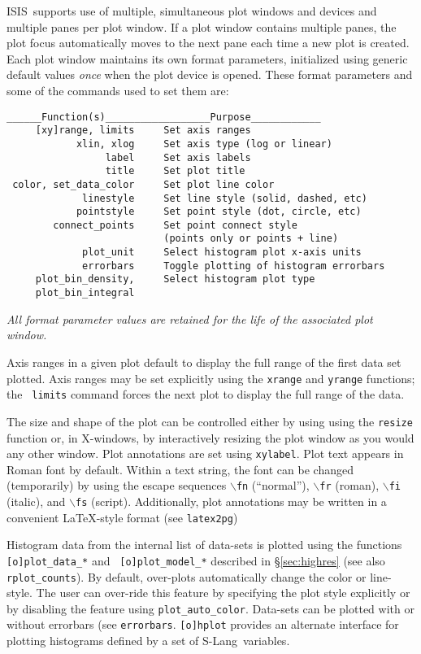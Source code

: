 \documentclass{book}
\newcommand{\isisx}{{\sc ISIS~}}
\newcommand{\slang}{{\sc S-Lang}}
\begin{document}
{\isisx supports use of multiple, simultaneous plot windows and devices and
multiple panes per plot window.  If a plot window contains
multiple panes, the plot focus automatically moves to the next
pane each time a new plot is created.  Each plot window maintains
its own format parameters, initialized using generic default
values {\it once} when the plot device is opened. These format
parameters and some of the commands used to set them are:

\begin{verbatim}
______Function(s)__________________Purpose____________
     [xy]range, limits     Set axis ranges
            xlin, xlog     Set axis type (log or linear)
                 label     Set axis labels
                 title     Set plot title
 color, set_data_color     Set plot line color
             linestyle     Set line style (solid, dashed, etc)
            pointstyle     Set point style (dot, circle, etc)
        connect_points     Set point connect style
                           (points only or points + line)
             plot_unit     Select histogram plot x-axis units
             errorbars     Toggle plotting of histogram errorbars
     plot_bin_density,     Select histogram plot type
     plot_bin_integral
\end{verbatim}

{\it All format parameter values are retained for the life of
the associated plot window.}

Axis ranges in a given plot default to display the full range
of the first data set plotted. Axis ranges may be set explicitly
using the {\tt xrange} and {\tt yrange} functions; the {\tt
limits} command forces the next plot to display the full range of
the data.

The size and shape of the plot can be controlled either by using using
the {\tt resize} function or, in X-windows, by interactively resizing
the plot window as you would any other window. Plot annotations are
set using {\tt xylabel}.  Plot text appears in Roman font by default.
Within a text string, the font can be changed (temporarily) by using
the escape sequences $\backslash${\tt fn} (``normal''),
$\backslash${\tt fr} (roman), $\backslash${\tt fi} (italic), and
$\backslash${\tt fs} (script).  Additionally, plot annotations
may be written in a convenient \LaTeX-style format (see
\verb|latex2pg|)

Histogram data from the internal list of data-sets is plotted
using the functions {\tt [o]plot\_data\_*} and {\tt
[o]plot\_model\_*} described in \S\ref{sec:highres} (see also
\verb|rplot_counts|). By default, over-plots automatically change the
color or line-style. The user can over-ride this feature by
specifying the plot style explicitly or by disabling the feature
using {\tt plot\_auto\_color}. Data-sets can be plotted with or
without errorbars (see {\tt errorbars}.  {\tt [o]hplot} provides
an alternate interface for plotting histograms defined by a set of
\slang\ variables.

}
\end{document}
